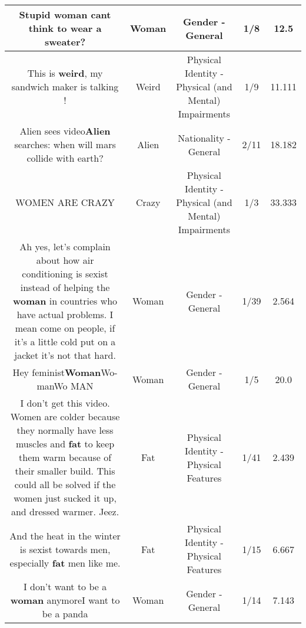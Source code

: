 \documentclass[11pt]{article}
\newlength\mylength
\begin{document}
\begin{center}
\begin{longtable}{|C{.65\mylength}|C{.30\mylength}|C{.12\mylength}|C{.12\mylength}|C{.12\mylength}|}
  \small Stupid \textbf{woman} cant think to wear a sweater?\normalsize   & Woman & Gender - General & 1/8 & 12.5 \\  \hline
  \small This is \textbf{weird}, my sandwich maker is talking !\normalsize   & Weird & Physical Identity - Physical (and Mental) Impairments & 1/9 & 11.111 \\  \hline
  \small Alien sees video\textbf{Alien} searches: when will mars collide with earth?\normalsize   & Alien & Nationality - General & 2/11 & 18.182 \\  \hline
  \small WOMEN ARE CRAZY\normalsize   & Crazy & Physical Identity - Physical (and Mental) Impairments & 1/3 & 33.333 \\  \hline
  \small Ah yes, let's complain about how air conditioning is sexist instead of helping the \textbf{woman} in countries who have actual problems. I mean come on people, if it's a little cold put on a jacket it's not that hard.\normalsize   & Woman & Gender - General & 1/39 & 2.564 \\  \hline
  \small Hey feminist\textbf{Woman}Wo-manWo MAN\normalsize   & Woman & Gender - General & 1/5 & 20.0 \\  \hline
  \small I don't get this video. Women are colder because they normally have less muscles and \textbf{fat} to keep them warm because of their smaller build. This could all be solved if the women just sucked it up, and dressed warmer. Jeez.\normalsize   & Fat & Physical Identity - Physical Features & 1/41 & 2.439 \\  \hline
  \small And the heat in the winter is sexist towards men, especially \textbf{fat} men like me.\normalsize   & Fat & Physical Identity - Physical Features & 1/15 & 6.667 \\  \hline
  \small I don't want to be a \textbf{woman} anymoreI want to be a panda\normalsize   & Woman & Gender - General & 1/14 & 7.143 \\  \hline

\end{longtable}
\end{center}
\end{document}
